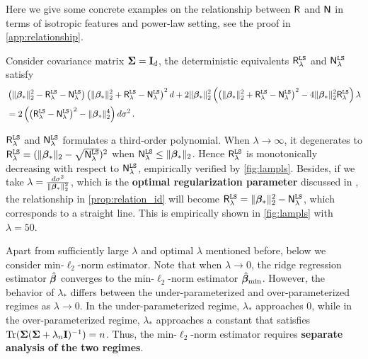 Here we give some concrete examples on the relationship between $\mathsf R$ and  $\mathsf N$ in terms of isotropic features and power-law setting, see the proof in \cref{app:relationship}.

\begin{proposition}\label{prop:relation_id}
    Consider covariance matrix ${\boldsymbol \Sigma} = {\mathbf I}_d$, the deterministic equivalents $\mathsf R^{\tt LS}_{\lambda}$ and $\mathsf N^{\tt LS}_{\lambda}$ satisfy
    \[
    \begin{aligned}
        & \left(\|{\boldsymbol \beta}_*\|_2^2 - \mathsf R^{\tt LS}_{\lambda} - \mathsf N^{\tt LS}_{\lambda}\right)\left(\|{\boldsymbol \beta}_*\|_2^2 + \mathsf R^{\tt LS}_{\lambda} - \mathsf N^{\tt LS}_{\lambda}\right)^2d + 2\|{\boldsymbol \beta}_*\|_2^2\left(\left(\|{\boldsymbol \beta}_*\|_2^2 + \mathsf R^{\tt LS}_{\lambda} - \mathsf N^{\tt LS}_{\lambda}\right)^2-4\|{\boldsymbol \beta}_*\|_2^2\mathsf R^{\tt LS}_{\lambda} \right) \lambda\\
        &= 2\left( \left(\mathsf R^{\tt LS}_{\lambda} - \mathsf N^{\tt LS}_{\lambda}\right)^2 - \|{\boldsymbol \beta}_*\|_2^4 \right) d \sigma^2\,.
    \end{aligned}
    \]
\end{proposition}
\vspace{-0.2cm}
 $\mathsf R^{\tt LS}_\lambda$ and $\mathsf N^{\tt LS}_\lambda$ formulates a third-order polynomial.
When $\lambda \to \infty$, it degenerates to $\mathsf R^{\tt LS}_{\lambda} = (\|{\boldsymbol \beta}_*\|_2 - \sqrt{\mathsf N^{\tt LS}_{\lambda}})^2 $ when $ \mathsf N^{\tt LS}_{\lambda} \leq \|{\boldsymbol \beta}_*\|_2$.
Hence \( \mathsf R^{\tt LS}_{\lambda} \) is monotonically decreasing with respect to \( \mathsf N^{\tt LS}_{\lambda} \), empirically verified by \cref{fig:lampls}.
Besides, if we take $\lambda = \frac{d\sigma^2}{\|{\boldsymbol \beta}_*\|_2^2}$, which is the {\bf optimal regularization parameter} discussed in \citet{wu2020optimal, nakkiran2020optimal}, the relationship in \cref{prop:relation_id} will become $\mathsf R^{\tt LS}_{\lambda} = \|{\boldsymbol \beta}_*\|_2^2 - \mathsf N^{\tt LS}_{\lambda}$, which corresponds to a straight line. This is empirically shown in \cref{fig:lampls} with $\lambda=50$.
   

Apart from sufficiently large $\lambda$ and optimal $\lambda$ mentioned before, below we consider min-$\ell_2$-norm estimator. 
Note that when $\lambda \to 0$, the ridge regression estimator $\hat{{\boldsymbol \beta}}$ converges to the min-$\ell_2$-norm estimator $\hat{{\boldsymbol \beta}}_{\min}$.
However, the behavior of \(\lambda_*\) differs between the under-parameterized and over-parameterized regimes as \(\lambda \to 0\). In the under-parameterized regime, \(\lambda_*\) approaches 0, while in the over-parameterized regime, \(\lambda_*\) approaches a constant that satisfies \({\rm Tr}({\boldsymbol \Sigma}({\boldsymbol \Sigma} + \lambda_n {\mathbf I})^{-1}) = n\).
Thus, the min-\(\ell_2\)-norm estimator requires {\bf separate analysis of the two regimes}. 


